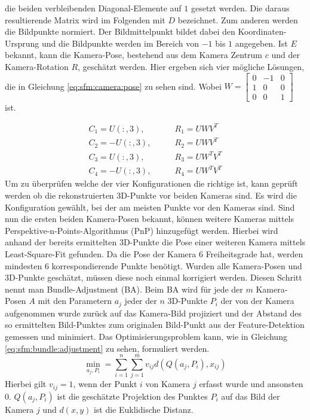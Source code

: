 \documentclass[12pt,titlepage, twoside]{article}
\begin{document}
die beiden verbleibenden Diagonal-Elemente auf $1$ gesetzt werden. Die daraus resultierende Matrix wird im Folgenden mit $D$ bezeichnet. Zum anderen werden die Bildpunkte normiert.
Der Bildmittelpunkt bildet dabei den Koordinaten-Ursprung und die Bildpunkte werden im Bereich von $-1$ bis $1$ angegeben.
Ist $E$ bekannt, kann die Kamera-Pose, bestehend aus dem Kamera Zentrum $c$ und der Kamera-Rotation $R$, geschätzt werden.
Hier ergeben sich vier mögliche Lösungen, die in Gleichung \ref{eq:sfm:camera:pose} zu sehen sind. Wobei $W=
\begin{bmatrix}
    0 & -1 & 0\\
    1 & 0 & 0\\
    0 & 0 & 1
\end{bmatrix}
$ ist.

\begin{equation}
    \label{eq:sfm:camera:pose}
    \begin{split}
    C_1=U(:,3),&\qquad R_1=UWV^T \\
    C_2=-U(:,3),&\qquad R_2=UWV^T \\
    C_3=U(:,3),&\qquad R_3=UW^TV^T \\
    C_4=-U(:,3),&\qquad R_4=UW^TV^T
    \end{split}
\end{equation}
Um zu überprüfen welche der vier Konfigurationen die richtige ist, kann geprüft werden ob die rekonstruierten 3D-Punkte vor beiden Kameras sind. Es wird die Konfiguration gewählt, bei der am meisten Punkte vor den Kameras sind.
Sind nun die ersten beiden Kamera-Posen bekannt, können weitere Kameras mittels Perspektive-n-Points-Algorithmus (PnP) hinzugefügt werden. 
Hierbei wird anhand der bereits ermittelten 3D-Punkte die Pose einer weiteren Kamera mittels Least-Square-Fit gefunden. Da die Pose der Kamera 6 Freiheitsgrade hat, werden mindesten 6 korrespondierende Punkte benötigt. 
Wurden alle Kamera-Posen und 3D-Punkte geschätzt, müssen diese noch einmal korrigiert werden. Diesen Schritt nennt man Bundle-Adjustment (BA).
Beim BA wird für jede der $m$ Kamera-Posen $A$ mit den Parametern $a_j$ jeder der $n$ 3D-Punkte $P_i$ der von der Kamera aufgenommen wurde zurück auf das Kamera-Bild projiziert und 
der Abstand des so ermittelten Bild-Punktes zum originalen Bild-Punkt aus der Feature-Detektion gemessen und minimiert. 
Das Optimisierungsproblem kann, wie in Gleichung \ref{eq:sfm:bundle:adjustment} zu sehen, formuliert werden. 
\begin{equation}
    \label{eq:sfm:bundle:adjustment}
    \min_{a_j, P_i} = \sum_{i=1}^n \sum_{j=1}^m v_{ij} d(Q(a_j, P_i), x_{ij})
\end{equation}
Hierbei gilt $v_{ij} = 1$, wenn der Punkt $i$ von Kamera $j$ erfasst wurde und ansonsten $0$.
$Q(a_j, P_i)$ ist die geschätzte Projektion des Punktes $P_i$ auf das Bild der Kamera $j$ und $d(x,y)$ ist die Euklidische Distanz.
\end{document}
